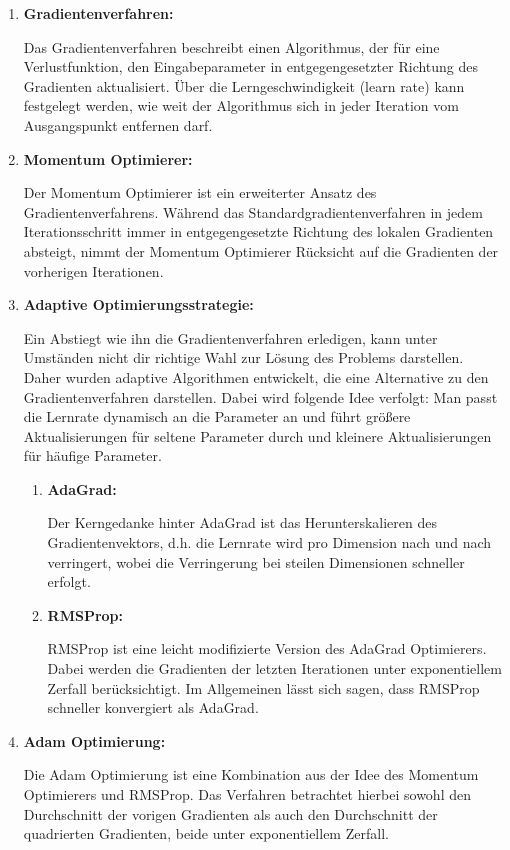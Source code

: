 	\begin{enumerate}
		\item \textbf{Gradientenverfahren:}
		
			Das Gradientenverfahren beschreibt einen Algorithmus, der für eine Verlustfunktion, den Eingabeparameter in entgegengesetzter Richtung des Gradienten aktualisiert. Über die  Lerngeschwindigkeit (learn rate) kann festgelegt werden, wie weit der Algorithmus sich in jeder Iteration vom Ausgangspunkt entfernen darf. \cite{lucas_plagwitz}
		
		\item \textbf{Momentum Optimierer:}
		
			Der Momentum Optimierer ist ein erweiterter Ansatz des Gradientenverfahrens. Während das \glqq Standardgradientenverfahren\grqq{} in jedem Iterationsschritt immer in entgegengesetzte Richtung des lokalen Gradienten absteigt, nimmt der Momentum Optimierer Rücksicht auf die Gradienten der vorherigen Iterationen. \cite{lucas_plagwitz}
			
		\item \textbf{Adaptive Optimierungsstrategie:}
		
			Ein Abstiegt wie ihn die Gradientenverfahren erledigen, kann unter Umständen nicht dir richtige Wahl zur Lösung des Problems darstellen. Daher wurden adaptive Algorithmen entwickelt, die eine Alternative zu den Gradientenverfahren darstellen. Dabei wird folgende Idee verfolgt: Man passt die Lernrate dynamisch an die Parameter an und führt größere Aktualisierungen für seltene Parameter durch und kleinere Aktualisierungen für häufige Parameter. \cite{lucas_plagwitz}
			
			\begin{enumerate}
				\item \textbf{AdaGrad:}
				
					Der Kerngedanke hinter AdaGrad ist das Herunterskalieren des Gradientenvektors, \acs{d.h.} die Lernrate wird pro Dimension nach und nach verringert, wobei die Verringerung bei steilen Dimensionen schneller erfolgt. \cite{lucas_plagwitz}
					
				\item \textbf{RMSProp:}
				
					RMSProp ist eine leicht modifizierte Version des AdaGrad Optimierers. Dabei werden die Gradienten der letzten Iterationen unter exponentiellem Zerfall  berücksichtigt. Im Allgemeinen lässt sich sagen, dass RMSProp schneller konvergiert als AdaGrad. \cite{lucas_plagwitz}
				
					
			\end{enumerate}
		
			
		\item \textbf{Adam Optimierung:}
		
			Die Adam Optimierung ist eine Kombination aus der Idee des Momentum Optimierers und RMSProp. Das Verfahren betrachtet hierbei sowohl den Durchschnitt der vorigen Gradienten als auch den Durchschnitt der quadrierten Gradienten, beide unter exponentiellem Zerfall. \cite{lucas_plagwitz}
			
	\end{enumerate}

